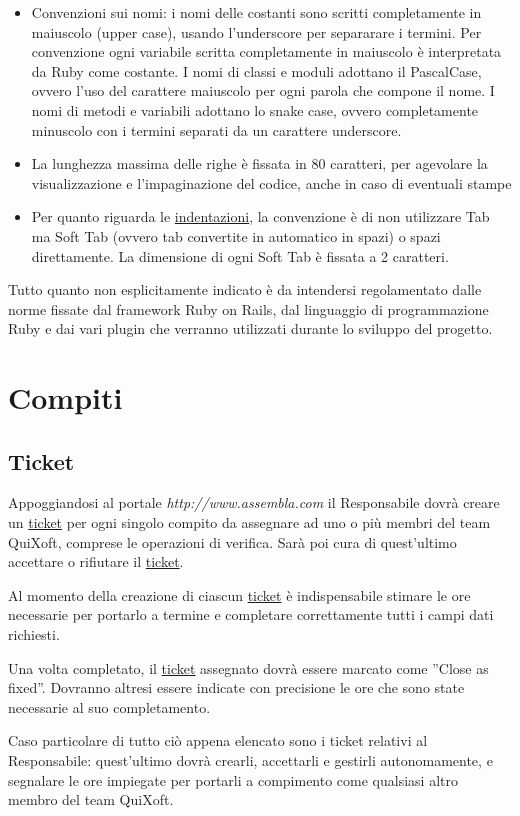 \documentclass[11pt,a4paper]{article}
\begin{document}
\begin{itemize}
  \item Convenzioni sui nomi: i nomi delle costanti sono scritti completamente in maiuscolo (upper case), usando l’underscore per separarare i termini. Per convenzione ogni variabile scritta completamente in maiuscolo è interpretata da Ruby come costante. I nomi di classi e moduli adottano il PascalCase, ovvero l’uso del carattere maiuscolo per ogni parola che compone il nome. I nomi di metodi e variabili adottano lo snake case, ovvero completamente minuscolo con i termini separati da un carattere underscore.
  \item La lunghezza massima delle righe è fissata in 80 caratteri, per agevolare la visualizzazione e l'impaginazione del codice, anche in caso di eventuali stampe
  \item Per quanto riguarda le \underline{indentazioni}, la convenzione è di non utilizzare Tab ma Soft Tab (ovvero tab convertite in automatico in spazi) o spazi direttamente. La dimensione di ogni Soft Tab è fissata a 2 caratteri.
\end{itemize}
Tutto quanto non esplicitamente indicato è da intendersi regolamentato dalle norme fissate dal framework Ruby on Rails, dal linguaggio di programmazione Ruby e dai vari plugin che verranno utilizzati durante lo sviluppo del progetto.

\section{Compiti}
\subsection{Ticket}
Appoggiandosi al portale \textit{http://www.assembla.com} il Responsabile dovrà creare un \underline{ticket} per ogni singolo compito da assegnare ad uno o più membri del team QuiXoft, comprese le operazioni di verifica.
Sarà poi cura di quest'ultimo accettare o rifiutare il \underline{ticket}.

Al momento della creazione di ciascun \underline{ticket} è indispensabile stimare le ore necessarie per portarlo a termine e completare correttamente tutti i campi dati richiesti.

Una volta completato, il \underline{ticket} assegnato dovrà essere marcato come ''Close as fixed''. Dovranno altresi essere indicate con precisione le ore che sono state necessarie al suo completamento.

Caso particolare di tutto ciò appena elencato sono i ticket relativi al Responsabile: quest'ultimo dovrà crearli, accettarli e gestirli autonomamente, e segnalare le ore impiegate per portarli a compimento come qualsiasi altro membro del team QuiXoft.
\end{document}
